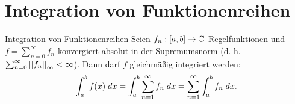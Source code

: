 \documentclass[main.tex]{subfiles}
\begin{document}
\section*{Integration von Funktionenreihen}

\begin{karte}{Integration von Funktionenreihen}
    Seien \( \abb{f_n}{[a,b]}{\C} \) Regelfunktionen 
    und \( f = \sum_{n=0}^\infty f_n \) konvergiert 
    absolut in der Supremumsnorm 
    (d. h. \( \sum_{n=0}^\infty \norm{f_n}_\infty < \infty \)). 
    Dann darf \(f\) gleichmäßig integriert werden:
    \[ \integral{f(x)}{a}{b} 
    = \integral{\sum_{n=1}^\infty f_n}{a}{b}
    = \sum_{n=1}^\infty \integral{f_n}{a}{b}. \]
\end{karte}
\end{document}
